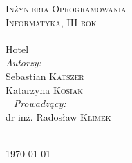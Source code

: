 \documentclass[a4paper, 11pt]{article}
\begin{document}
\begin{titlepage}
		\begin{center}
				\begin{figure}[H]%
				\end{figure}
	    \end{center}
		\textsc{\large Inżynieria Oprogramowania}\\%
		\textsc{\large Informatyka, III rok}\\[0.5cm] %
		
		
		\HRule \\[0.4cm]
		{\fontsize{38}{50}\selectfont Hotel}
		\HRule \\[1.5cm]
		
	
		\Large \emph{Autorzy:}\\
		Sebastian \textsc{Katszer}\\
		Katarzyna \textsc{Kosiak}\\[1cm]\ %
			\Large \emph{Prowadzący:}\\
			dr inż. Radosław \textsc{Klimek}\\[2cm]\ %
		
		
		
		{\large \today}\\[3cm] %
		
		
		
		
		\vfill %
		
	\end{titlepage}
	
\end{document}
